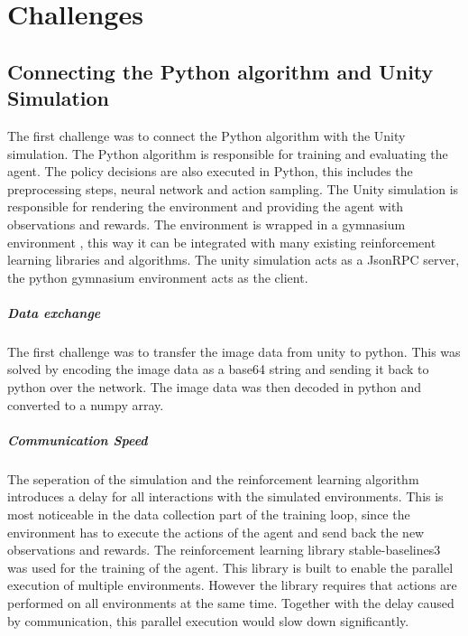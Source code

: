\chapter{Challenges}
\label{cha:challenges}

\section{Connecting the Python algorithm and Unity Simulation}

The first challenge was to connect the Python algorithm with the Unity simulation. The Python algorithm is responsible for training and evaluating the agent. The policy decisions are also executed in Python, this includes the preprocessing steps, neural network and action sampling. The Unity simulation is responsible for rendering the environment and providing the agent with observations and rewards. The environment is wrapped in a gymnasium environment \textcite{gymnasium}, this way it can be integrated with many existing reinforcement learning libraries and algorithms. The unity simulation acts as a JsonRPC server, the python gymnasium environment acts as the client.

\paragraph{Data exchange}
The first challenge was to transfer the image data from unity to python. This was solved by encoding the image data as a base64 string and sending it back to python over the network. The image data was then decoded in python and converted to a numpy array.

\paragraph{Communication Speed}
The seperation of the simulation and the reinforcement learning algorithm introduces a delay for all interactions with the simulated environments. This is most noticeable in the data collection part of the training loop, since the environment has to execute the actions of the agent and send back the new observations and rewards. 
The reinforcement learning library stable-baselines3 \textcite{sb3} was used for the training of the agent. This library is built to enable the parallel execution of multiple environments. However the library requires that actions are performed on all environments at the same time. Together with the delay caused by communication, this parallel execution would slow down significantly.

